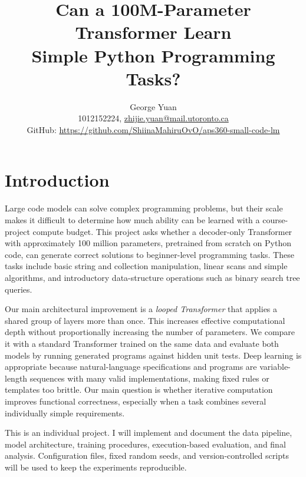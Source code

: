\documentclass[final]{article}
\title{\vspace{-0.35in}\textbf{Can a 100M-Parameter Transformer Learn\\
Simple Python Programming Tasks?}}
\author{
  George Yuan\\
  1012152224, \href{mailto:zhijie.yuan@mail.utoronto.ca}{zhijie.yuan@mail.utoronto.ca}\\
  GitHub: \url{https://github.com/ShiinaMahiruOvO/aps360-small-code-lm}
}
\date{}
\begin{document}
\maketitle
\vspace{-0.38in}

\section*{Introduction}
Large code models can solve complex programming problems, but their scale makes it difficult to determine how much ability can be learned with a course-project compute budget. This project asks whether a decoder-only Transformer with approximately 100 million parameters, pretrained from scratch on Python code, can generate correct solutions to beginner-level programming tasks. These tasks include basic string and collection manipulation, linear scans and simple algorithms, and introductory data-structure operations such as binary search tree queries.

Our main architectural improvement is a \emph{looped Transformer} that applies a shared group of layers more than once. This increases effective computational depth without proportionally increasing the number of parameters. We compare it with a standard Transformer trained on the same data and evaluate both models by running generated programs against hidden unit tests. Deep learning is appropriate because natural-language specifications and programs are variable-length sequences with many valid implementations, making fixed rules or templates too brittle. Our main question is whether iterative computation improves functional correctness, especially when a task combines several individually simple requirements.

This is an individual project. I will implement and document the data pipeline, model architecture, training procedures, execution-based evaluation, and final analysis. Configuration files, fixed random seeds, and version-controlled scripts will be used to keep the experiments reproducible.
\end{document}
